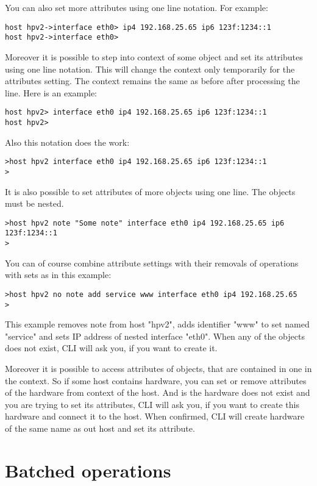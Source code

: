 \documentclass[deska]{subfiles}
\begin{document}
You can also set more attributes using one line notation. For example:
\begin{verbatim}
host hpv2->interface eth0> ip4 192.168.25.65 ip6 123f:1234::1 
host hpv2->interface eth0>
\end{verbatim}

Moreover it is possible to step into context of some object and set its attributes using one line notation. This will
change the context only temporarily for the attributes setting. The context remains the same as before after processing
the line. Here is an example:
\begin{verbatim}
host hpv2> interface eth0 ip4 192.168.25.65 ip6 123f:1234::1 
host hpv2>
\end{verbatim}

Also this notation does the work:
\begin{verbatim}
>host hpv2 interface eth0 ip4 192.168.25.65 ip6 123f:1234::1 
>
\end{verbatim}

It is also possible to set attributes of more objects using one line. The objects must be nested.
\begin{verbatim}
>host hpv2 note "Some note" interface eth0 ip4 192.168.25.65 ip6 123f:1234::1 
>
\end{verbatim}

You can of course combine attribute settings with their removals of operations with sets as in this example:
\begin{verbatim}
>host hpv2 no note add service www interface eth0 ip4 192.168.25.65 
>
\end{verbatim}
This example removes note from host "hpv2", adds identifier "www" to set named "service" and sets IP address of nested
interface "eth0". When any of the objects does not exist, CLI will ask you, if you want to create it.

Moreover it is possible to access attributes of objects, that are contained in one in the context. So if some host
contains hardware, you can set or remove attributes of the hardware from context of the host. And is the hardware
does not exist and you are trying to set its attributes, CLI will ask you, if you want to create this hardware and
connect it to the host. When confirmed, CLI will create hardware of the same name as out host and set its attribute.

\section{Batched operations}
\end{document}

